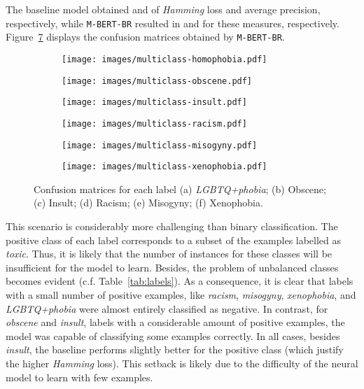 \documentclass[11pt,a4paper]{article}
\begin{document}
The baseline model obtained  and  of \textit{Hamming} loss and average precision, respectively, while \texttt{M-BERT-BR} resulted in  and  for these measures, respectively. Figure~\ref{fig:multilabelcm} displays the confusion matrices obtained by \texttt{M-BERT-BR}.

\begin{figure}[!ht]
\centering

\begin{subfigure}{.4\columnwidth}
  \centering
\texttt{[image: images/multiclass-homophobia.pdf]}
  \caption{}
  \label{fig:multiclass-homophobia}
\end{subfigure}
\begin{subfigure}{.4\columnwidth}
  \centering
\texttt{[image: images/multiclass-obscene.pdf]} 
  \caption{}
  \label{fig:multiclass-obscene}
\end{subfigure}
\begin{subfigure}{.4\columnwidth}
  \centering
\texttt{[image: images/multiclass-insult.pdf]}
  \caption{}
  \label{fig:multiclass-insult}
\end{subfigure}
\begin{subfigure}{.4\columnwidth}
\centering
\texttt{[image: images/multiclass-racism.pdf]}
  \caption{}
  \label{fig:multiclass-racism}
\end{subfigure}
\begin{subfigure}{.4\columnwidth}
  \centering
\texttt{[image: images/multiclass-misogyny.pdf]}
  \caption{}
  \label{fig:multiclass-misogyny}
\end{subfigure}
\begin{subfigure}{.4\columnwidth}
  \centering
\texttt{[image: images/multiclass-xenophobia.pdf]}
  \caption{}
  \label{fig:multiclass-xenophobia}
\end{subfigure}
\caption{Confusion matrices for each label (a) \textit{LGBTQ+phobia}; (b) Obscene; (c) Insult; (d) Racism; (e) Misogyny; (f) Xenophobia.}
\label{fig:multilabelcm}
\end{figure}

This scenario is considerably more challenging than binary classification. The positive class of each label corresponds to a subset of the examples labelled as \textit{toxic}. Thus, it is likely that the number of instances for these classes will be insufficient for the model to learn. Besides, the problem of unbalanced classes becomes evident (c.f. Table~\ref{tab:labels}). As a consequence, it is clear that labels with a small number of positive examples, like \textit{racism}, \textit{misogyny}, \textit{xenophobia}, and \textit{LGBTQ+phobia} were almost entirely classified as negative. In contrast, for \textit{obscene} and \textit{insult}, labels with a considerable amount of positive examples, the model was capable of classifying some examples correctly. In all cases, besides \textit{insult}, the baseline performs slightly better for the positive class (which justify the higher \textit{Hamming} loss). This setback is likely due to the difficulty of the neural model to learn with few examples.
\end{document}
